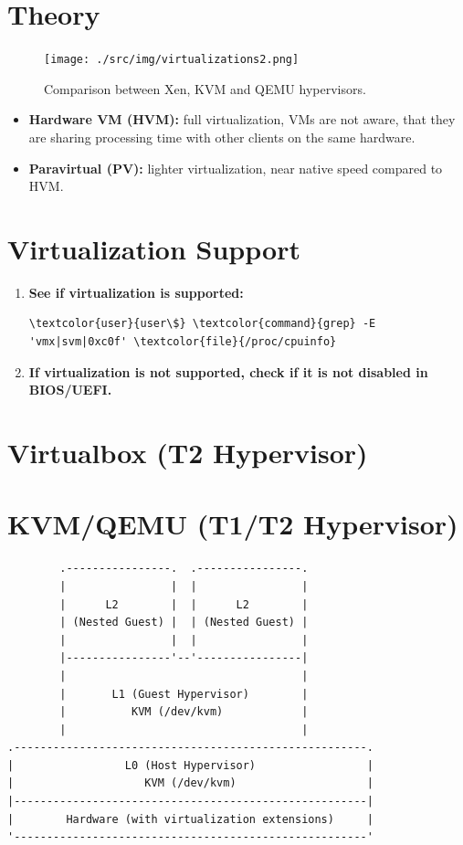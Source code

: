 \documentclass[10pt, a4paper, onecolumn, oneside, titlepage, openany]{book}
\begin{document}
\section{Theory}
\begin{figure}[ht]
    \begin{center}
        \texttt{[image: ./src/img/virtualizations2.png]}
        \caption{Comparison between Xen, KVM and QEMU hypervisors.}
        \label{fig:3}
    \end{center}
\end{figure}
\begin{itemize}
    \item \textbf{Hardware VM (HVM):} full virtualization, VMs are not aware, that they are sharing processing time with other clients on the same hardware.
    \item \textbf{Paravirtual (PV):} lighter virtualization, near native speed compared to HVM.
\end{itemize}

\section{Virtualization Support}
\begin{enumerate}
    \item \textbf{See if virtualization is supported:}
\begin{Verbatim}[commandchars=\\\{\}]
\textcolor{user}{user\$} \textcolor{command}{grep} -E 'vmx|svm|0xc0f' \textcolor{file}{/proc/cpuinfo}
\end{Verbatim}
    \item \textbf{If virtualization is not supported, check if it is not disabled in BIOS/UEFI.}
\end{enumerate}

\section{Virtualbox (T2 Hypervisor)}



\section{KVM/QEMU (T1/T2 Hypervisor)}
\begin{verbatim}
        .----------------.  .----------------.
        |                |  |                |
        |      L2        |  |      L2        |
        | (Nested Guest) |  | (Nested Guest) |
        |                |  |                |
        |----------------'--'----------------|
        |                                    |
        |       L1 (Guest Hypervisor)        |
        |          KVM (/dev/kvm)            |
        |                                    |
.------------------------------------------------------.
|                 L0 (Host Hypervisor)                 |
|                    KVM (/dev/kvm)                    |
|------------------------------------------------------|
|        Hardware (with virtualization extensions)     |
'------------------------------------------------------'
\end{verbatim}
\end{document}
